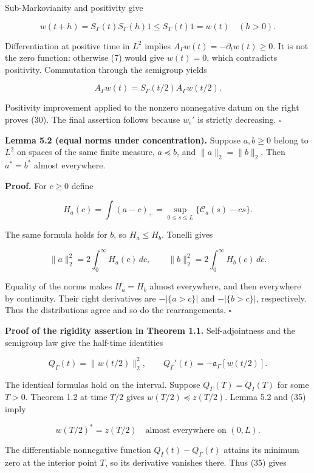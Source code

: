 \documentclass[11pt]{article}
\begin{document}
Sub-Markovianity and positivity give

\[
w(t+h)=S_\Gamma(t)S_\Gamma(h)1\le S_\Gamma(t)1=w(t)
\quad(h>0).
\tag{31}
\]

Differentiation at positive time in \(L^2\) implies
\(A_\Gamma w(t)=-\partial_t w(t)\ge0\). It is not the zero function:
otherwise (7) would give \(w(t)=0\), which contradicts positivity.
Commutation through the semigroup yields

\[
A_\Gamma w(t)=S_\Gamma(t/2)A_\Gamma w(t/2).
\tag{32}
\]

Positivity improvement applied to the nonzero nonnegative datum on the
right proves (30). The final assertion follows because \(w_e'\) is
strictly decreasing. \(\square\)

\textbf{Lemma 5.2 (equal norms under concentration).} Suppose
\(a,b\ge0\) belong to \(L^2\) on spaces of the same finite measure,
\(a\preccurlyeq b\), and \(\|a\|_2=\|b\|_2\). Then \(a^*=b^*\) almost
everywhere.

\textbf{Proof.} For \(c\ge0\) define

\[
H_a(c)=\int(a-c)_+
=\sup_{0\le s\le L}\{\mathcal C_a(s)-cs\}.
\tag{33}
\]

The same formula holds for \(b\), so \(H_a\le H_b\). Tonelli gives

\[
\|a\|_2^2=2\int_0^\infty H_a(c)\,dc,
\qquad
\|b\|_2^2=2\int_0^\infty H_b(c)\,dc.
\tag{34}
\]

Equality of the norms makes \(H_a=H_b\) almost everywhere, and then
everywhere by continuity. Their right derivatives are \(-|\{a>c\}|\) and
\(-|\{b>c\}|\), respectively. Thus the distributions agree and so do the
rearrangements. \(\square\)

\textbf{Proof of the rigidity assertion in Theorem 1.1.}
Self-adjointness and the semigroup law give the half-time identities

\[
Q_\Gamma(t)=\|w(t/2)\|_2^2,
\qquad
Q_\Gamma'(t)=-\mathfrak a_\Gamma[w(t/2)].
\tag{35}
\]

The identical formulas hold on the interval. Suppose
\(Q_\Gamma(T)=Q_I(T)\) for some \(T>0\). Theorem 1.2 at time \(T/2\)
gives \(w(T/2)\preccurlyeq z(T/2)\). Lemma 5.2 and (35) imply

\[
w(T/2)^*=z(T/2)
\quad\text{almost everywhere on }(0,L).
\tag{36}
\]

The differentiable nonnegative function \(Q_I(t)-Q_\Gamma(t)\) attains
its minimum zero at the interior point \(T\), so its derivative vanishes
there. Thus (35) gives
\end{document}
